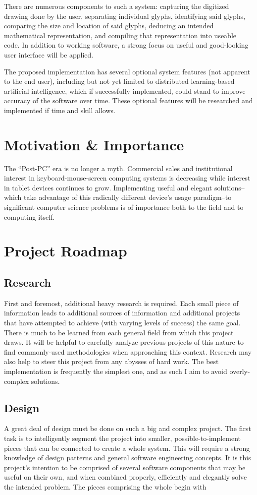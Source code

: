 \documentclass{acm_proc_article-sp}
\begin{document}
There are numerous components to such a system: capturing the digitized drawing done by the user, separating individual glyphs, identifying said glyphs, comparing the size and location of said glyphs, deducing an intended mathematical representation, and compiling that representation into useable code. In addition to working software, a strong focus on useful and good-looking user interface will be applied. 

The proposed implementation has several optional system features (not apparent to the end user), including but not yet limited to distributed learning-based artificial intelligence, which if successfully implemented, could stand to improve accuracy of the software over time. These optional features will be researched and implemented if time and skill allows.

\section{Motivation \& Importance}
The ``Post-PC'' era is no longer a myth. Commercial sales and institutional interest in keyboard-mouse-screen computing systems is decreasing while interest in tablet devices continues to grow. Implementing useful and elegant solutions--which take advantage of this radically different device's usage paradigm--to significant computer science problems is of importance both to the field and to computing itself. 

\section{Project Roadmap}

\subsection{Research}
First and foremost, additional heavy research is required. Each small piece of information leads to additional sources of information and additional projects that have attempted to achieve (with varying levels of success) the same goal. There is much to be learned from each general field from which this project draws. It will be helpful to carefully analyze previous projects of this nature to find commonly-used methodologies when approaching this context. Research may also help to steer this project from any abysses of hard work. The best implementation is frequently the simplest one, and as such I aim to avoid overly-complex solutions.

\subsection{Design}
A great deal of design must be done on such a big and complex project. The first task is to intelligently segment the project into smaller, possible-to-implement pieces that can be connected to create a whole system. This will require a strong knowledge of design patterns and general software engineering concepts. It is this project's intention to be comprised of several software components that may be useful on their own, and when combined properly, efficiently and elegantly solve the intended problem. The pieces comprising the whole begin with 
\end{document}
